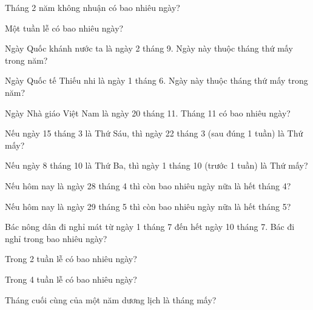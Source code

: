 \begin{ex}
Tháng 2 năm không nhuận có bao nhiêu ngày?
\end{ex}

\begin{ex}
Một tuần lễ có bao nhiêu ngày?
\end{ex}

\begin{ex}
Ngày Quốc khánh nước ta là ngày 2 tháng 9. Ngày này thuộc tháng thứ mấy trong năm?
\end{ex}

\begin{ex}
Ngày Quốc tế Thiếu nhi là ngày 1 tháng 6. Ngày này thuộc tháng thứ mấy trong năm?
\end{ex}

\begin{ex}
Ngày Nhà giáo Việt Nam là ngày 20 tháng 11. Tháng 11 có bao nhiêu ngày?
\end{ex}

\begin{ex}
Nếu ngày 15 tháng 3 là Thứ Sáu, thì ngày 22 tháng 3 (sau đúng 1 tuần) là Thứ mấy?
\end{ex}

\begin{ex}
Nếu ngày 8 tháng 10 là Thứ Ba, thì ngày 1 tháng 10 (trước 1 tuần) là Thứ mấy?
\end{ex}

\begin{ex}
Nếu hôm nay là ngày 28 tháng 4 thì còn bao nhiêu ngày nữa là hết tháng 4?
\end{ex}

\begin{ex}
Nếu hôm nay là ngày 29 tháng 5 thì còn bao nhiêu ngày nữa là hết tháng 5?
\end{ex}

\begin{ex}
Bác nông dân đi nghỉ mát từ ngày 1 tháng 7 đến hết ngày 10 tháng 7. Bác đi nghỉ trong bao nhiêu ngày?
\end{ex}

\begin{ex}
Trong 2 tuần lễ có bao nhiêu ngày?
\end{ex}

\begin{ex}
Trong 4 tuần lễ có bao nhiêu ngày?
\end{ex}

\begin{ex}
Tháng cuối cùng của một năm dương lịch là tháng mấy?
\end{ex}
